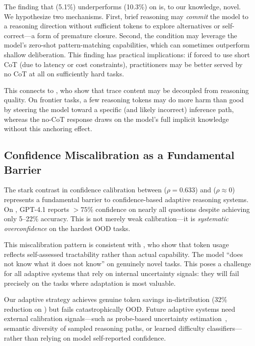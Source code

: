 The finding that \shortbudget (5.1\%) underperforms \nocot (10.3\%) on \musr is, to our knowledge, novel. We hypothesize two mechanisms. First, brief reasoning may \emph{commit} the model to a reasoning direction without sufficient tokens to explore alternatives or self-correct---a form of premature closure. Second, the \nocot condition may leverage the model's zero-shot pattern-matching capabilities, which can sometimes outperform shallow deliberation. This finding has practical implications: if forced to use short CoT (due to latency or cost constraints), practitioners may be better served by no CoT at all on sufficiently hard tasks.

This connects to \citet{valmeekam2025reasonless}, who show that trace content may be decoupled from reasoning quality. On frontier tasks, a few reasoning tokens may do more harm than good by steering the model toward a specific (and likely incorrect) inference path, whereas the no-CoT response draws on the model's full implicit knowledge without this anchoring effect.

\subsection{Confidence Miscalibration as a Fundamental Barrier}
\label{sec:discussion:confidence}

The stark contrast in confidence calibration between \math ($\rho{=}0.633$) and \musr ($\rho{\approx}0$) represents a fundamental barrier to confidence-based adaptive reasoning systems. On \musr, GPT-4.1 reports $>75\%$ confidence on nearly all questions despite achieving only 5--22\% accuracy. This is not merely weak calibration---it is \emph{systematic overconfidence} on the hardest OOD tasks.

This miscalibration pattern is consistent with \citet{dellibarda2025illusion}, who show that token usage reflects self-assessed tractability rather than actual capability. The model ``does not know what it does not know'' on genuinely novel tasks. This poses a challenge for all adaptive systems that rely on internal uncertainty signals: they will fail precisely on the tasks where adaptation is most valuable.

 Our adaptive strategy achieves genuine token savings in-distribution (32\% reduction on \math) but fails catastrophically OOD. Future adaptive systems need external calibration signals---such as probe-based uncertainty estimation~\citep{bogdan2025anchors}, semantic diversity of sampled reasoning paths, or learned difficulty classifiers---rather than relying on model self-reported confidence.

